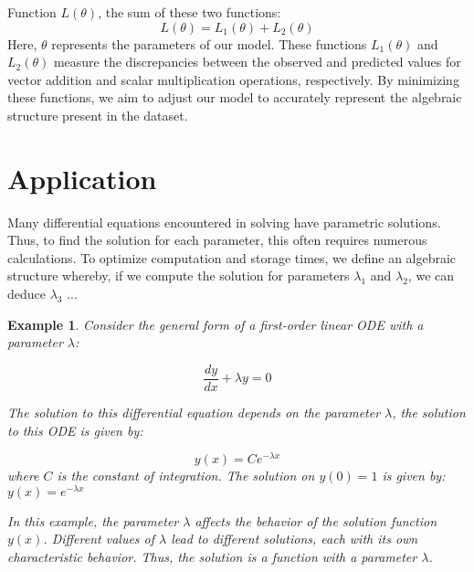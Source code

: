 \documentclass{report}
\newtheorem{Example}{Example}
\begin{document}
Function $L(\theta)$, the sum of these two functions:
\[
L(\theta) = L_1(\theta) + L_2(\theta)
\]
Here, $\theta$ represents the parameters of 
our model. These functions $L_1(\theta)$ and
$L_2(\theta)$ measure the discrepancies between 
the observed and predicted values for vector addition 
and scalar multiplication operations, respectively. 
By minimizing these functions, we aim to adjust our 
model to accurately represent the algebraic structure 
present in the dataset. \\  


\section{Application}
Many differential equations encountered 
in solving have parametric solutions.
Thus, to find the solution for each 
parameter, this often requires 
numerous calculations. To optimize 
computation and storage times, we 
define an algebraic structure 
whereby, if we compute the solution 
for parameters $\lambda_1$ and $ \lambda_2 $,
we can deduce $\lambda_3$ ...
\begin{Example}
    Consider the general form of a first-order linear ODE with a parameter $\lambda$:
    
    \[
    \frac{dy}{dx} + \lambda y = 0
    \]
    
    The solution to this differential 
    equation depends on the parameter
    $\lambda$, the solution to this ODE is given by:
    
    \[
    y(x) = C e^{-\lambda x}
    \]
    where $C$ is the constant of integration.
    The solution on $y(0)=1$ is given by:
    $y(x) = e^{-\lambda x}$
    



In this example, the parameter $\lambda$ affects the behavior of the solution function $y(x)$. Different values of $\lambda$ lead to different solutions, each with its own characteristic behavior. Thus, the solution is a function with a parameter $\lambda$.
\end{Example}
\end{document}
